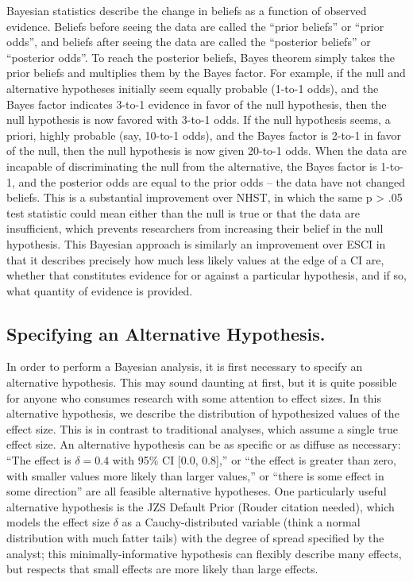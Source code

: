 \documentclass{article}
\begin{document}
Bayesian statistics describe the change in beliefs as a function of observed evidence. Beliefs before seeing the data are called the “prior beliefs” or “prior odds”, and beliefs after seeing the data are called the “posterior beliefs” or “posterior odds”. To reach the posterior beliefs, Bayes theorem simply takes the prior beliefs and multiplies them by the Bayes factor. For example, if the null and alternative hypotheses initially seem equally probable (1-to-1 odds), and the Bayes factor indicates 3-to-1 evidence in favor of the null hypothesis, then the null hypothesis is now favored with 3-to-1 odds. If the null hypothesis seems, a priori, highly probable (say, 10-to-1 odds), and the Bayes factor is 2-to-1 in favor of the null, then the null hypothesis is now given 20-to-1 odds. When the data are incapable of discriminating the null from the alternative, the Bayes factor is 1-to-1, and the posterior odds are equal to the prior odds – the data have not changed beliefs. This is a substantial improvement over NHST, in which the same p > .05 test statistic could mean either than the null is true or that the data are insufficient, which prevents researchers from increasing their belief in the null hypothesis. This Bayesian approach is similarly an improvement over ESCI in that it describes precisely how much less likely values at the edge of a CI are, whether that constitutes evidence for or against a particular hypothesis, and if so, what quantity of evidence is provided. 

\subsection{Specifying an Alternative Hypothesis.  }
In order to perform a Bayesian analysis, it is first necessary to specify an alternative hypothesis. This may sound daunting at first, but it is quite possible for anyone who consumes research with some attention to effect sizes. In this alternative hypothesis, we describe the distribution of hypothesized values of the effect size. This is in contrast to traditional analyses, which assume a single true effect size. An alternative hypothesis can be as specific or as diffuse as necessary: “The effect is $\delta = 0.4$ with 95\% CI [0.0, 0.8],” or “the effect is greater than zero, with smaller values more likely than larger values,” or “there is some effect in some direction” are all feasible alternative hypotheses. One particularly useful alternative hypothesis is the JZS Default Prior (Rouder citation needed), which models the effect size $\delta$ as a Cauchy-distributed variable (think a normal distribution with much fatter tails) with the degree of spread specified by the analyst; this minimally-informative hypothesis can flexibly describe many effects, but respects that small effects are more likely than large effects.
\end{document}

